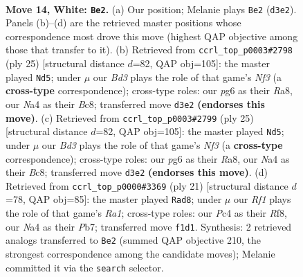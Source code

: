 \documentclass[11pt]{article}
\begin{document}
\clearpage

\begin{figure}[p]\centering
\begin{subfigure}{0.46\textwidth}\centering
\resizebox{\linewidth}{!}{%
\newchessgame
\chessboard[
  setfen={r1br2k1/ppp2p1p/3p1qp1/4b2n/N1P1P3/3B3P/PP1Q1PP1/R1B2RK1 w - - 7 14},
  showmover=false,
  pgfstyle=straightmove, color=movearrow, markmove={d3-e2}
]}
\caption{}
\end{subfigure}\hfill
\begin{subfigure}{0.46\textwidth}\centering
\resizebox{\linewidth}{!}{%
\newchessgame
\chessboard[
  setfen={r1bq1rk1/pp2bppp/4pn2/2p5/P7/1BPP1N1Q/2P2PPP/R1B1R1K1 b - - 0 13},
  showmover=false,
  pgfstyle=straightmove, color=movearrow, markmove={f6-d5}
]}
\caption{}
\end{subfigure}
\\[4pt]
\begin{subfigure}{0.46\textwidth}\centering
\resizebox{\linewidth}{!}{%
\newchessgame
\chessboard[
  setfen={r1bq1rk1/pp2bppp/4pn2/2p5/P7/1BPP1N1Q/2P2PPP/R1B1R1K1 b - - 0 13},
  showmover=false,
  pgfstyle=straightmove, color=movearrow, markmove={f6-d5}
]}
\caption{}
\end{subfigure}\hfill
\begin{subfigure}{0.46\textwidth}\centering
\resizebox{\linewidth}{!}{%
\newchessgame
\chessboard[
  setfen={r4rk1/pppqbppp/2npb3/8/8/2P1BN1P/PPPQ1PP1/1K1R1B1R b - - 0 11},
  showmover=false,
  pgfstyle=straightmove, color=movearrow, markmove={a8-d8}
]}
\caption{}
\end{subfigure}
\caption{\textbf{Move 14, White: \texttt{Be2}.} (a) Our position; Melanie plays \texttt{Be2} (\texttt{d3e2}). Panels (b)--(d) are the retrieved master positions whose correspondence most drove this move (highest QAP objective among those that transfer to it). (b) Retrieved from \texttt{ccrl\_top\_p0003\#2798} (ply 25) [structural distance $d$=82, QAP obj=105]: the master played \texttt{Nd5}; under $\mu$ our \emph{Bd3} plays the role of that game's \emph{Nf3} (a \textbf{cross-type} correspondence); cross-type roles: our \emph{p}g6 as their \emph{R}a8, our \emph{N}a4 as their \emph{B}c8; transferred move \texttt{d3e2} \textbf{(endorses this move)}. (c) Retrieved from \texttt{ccrl\_top\_p0003\#2799} (ply 25) [structural distance $d$=82, QAP obj=105]: the master played \texttt{Nd5}; under $\mu$ our \emph{Bd3} plays the role of that game's \emph{Nf3} (a \textbf{cross-type} correspondence); cross-type roles: our \emph{p}g6 as their \emph{R}a8, our \emph{N}a4 as their \emph{B}c8; transferred move \texttt{d3e2} \textbf{(endorses this move)}. (d) Retrieved from \texttt{ccrl\_top\_p0000\#3369} (ply 21) [structural distance $d$=78, QAP obj=85]: the master played \texttt{Rad8}; under $\mu$ our \emph{Rf1} plays the role of that game's \emph{Ra1}; cross-type roles: our \emph{P}c4 as their \emph{R}f8, our \emph{N}a4 as their \emph{P}b7; transferred move \texttt{f1d1}. Synthesis: 2 retrieved analogs transferred to \texttt{Be2} (summed QAP objective 210, the strongest correspondence among the candidate moves); Melanie committed it via the \texttt{search} selector.}
\label{fig:thought-m26}
\end{figure}
\end{document}
